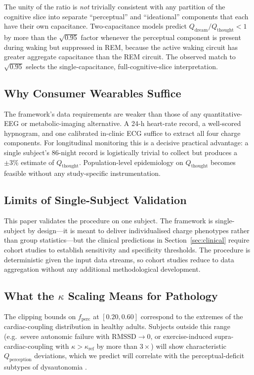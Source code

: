 \documentclass[11pt,twocolumn,a4paper]{article}
\theoremstyle{definition}
\theoremstyle{remark}
\newcommand{\Qth}{Q_{\mathrm{thought}}}
\newcommand{\Qpe}{Q_{\mathrm{perception}}}
\newcommand{\Qdr}{Q_{\mathrm{dream}}}
\newcommand{\RMSSD}{\mathrm{RMSSD}}
\begin{document}
The unity of the ratio is \emph{not} trivially consistent with any
partition of the cognitive slice into separate ``perceptual'' and
``ideational'' components that each have their own capacitance.
Two-capacitance models predict $\Qdr/\Qth<1$ by
more than the $\sqrt{0.95}$ factor whenever the perceptual component
is present during waking but suppressed in REM, because
the active waking circuit has greater aggregate capacitance than
the REM circuit. The observed match to $\sqrt{0.95}$ selects the
single-capacitance, full-cognitive-slice interpretation.

\subsection{Why Consumer Wearables Suffice}

The framework's data requirements are weaker than those of any
quantitative-EEG or metabolic-imaging alternative. A 24-h
heart-rate record, a well-scored hypnogram, and one calibrated
in-clinic ECG suffice to extract all four charge components. For
longitudinal monitoring this is a decisive practical advantage: a
single subject's 86-night record is logistically trivial to collect
but produces a $\pm 3\%$ estimate of $\Qth$. Population-level
epidemiology on $\Qth$ becomes feasible without any study-specific
instrumentation.

\subsection{Limits of Single-Subject Validation}

This paper validates the procedure on one subject. The framework is
single-subject by design---it is meant to deliver individualised
charge phenotypes rather than group statistics---but the clinical
predictions in Section~\ref{sec:clinical} require cohort studies to
establish sensitivity and specificity thresholds. The procedure is
deterministic given the input data streams, so cohort studies reduce
to data aggregation without any additional methodological
development.

\subsection{What the $\kappa$ Scaling Means for Pathology}

The clipping bounds on $f_{\mathrm{perc}}$ at $[0.20,0.60]$ correspond
to the extremes of the cardiac-coupling distribution in healthy
adults. Subjects outside this range (e.g.\ severe autonomic failure
with $\RMSSD\to 0$, or exercise-induced supra-cardiac-coupling with
$\kappa>\kappa_{\mathrm{ref}}$ by more than $3\times$) will show
characteristic $\Qpe$ deviations, which we predict will correlate
with the perceptual-deficit subtypes of dysautonomia
\citep{freeman2011}.
\end{document}
